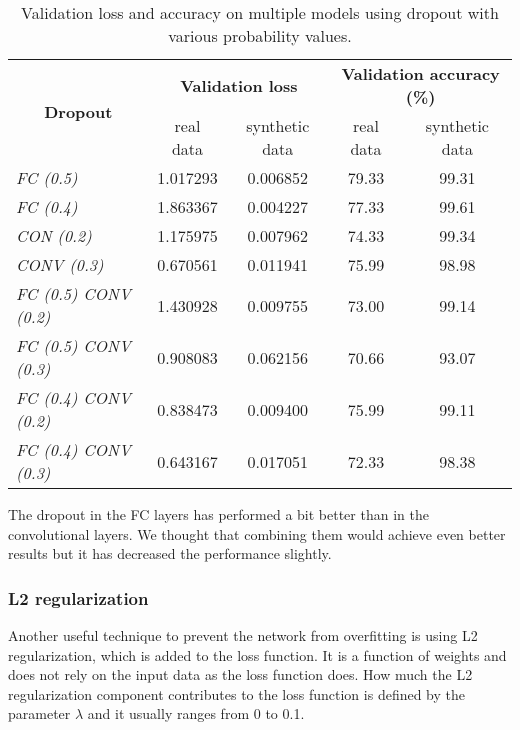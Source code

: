 {\renewcommand{\arraystretch}{1.4}
\begin{table}[h]
\centering
\begin{tabular}{|l|cc|cc|}
\hline
\multicolumn{1}{|c|}{\multirow{2}{*}{\textbf{Dropout}}} & \multicolumn{2}{c|}{\textbf{Validation loss}} & \multicolumn{2}{c|}{\textbf{Validation accuracy (\%)}} \\ \cline{2-5} 
\multicolumn{1}{|c|}{} & \multicolumn{1}{c|}{real data} & synthetic data & \multicolumn{1}{c|}{real data} & synthetic data \\ \hline
\textit{FC (0.5)} & \multicolumn{1}{c|}{1.017293} & 0.006852 & \multicolumn{1}{c|}{79.33} & 99.31 \\ \hline
\textit{FC (0.4)} & \multicolumn{1}{c|}{1.863367} & 0.004227 & \multicolumn{1}{c|}{77.33} & 99.61 \\ \hline
\textit{CON (0.2)} & \multicolumn{1}{c|}{1.175975} & 0.007962 & \multicolumn{1}{c|}{74.33} & 99.34 \\ \hline
\textit{CONV (0.3)} & \multicolumn{1}{c|}{0.670561} & 0.011941 & \multicolumn{1}{c|}{75.99} & 98.98 \\ \hline
\textit{FC (0.5) CONV (0.2)} & \multicolumn{1}{c|}{1.430928} & 0.009755 & \multicolumn{1}{c|}{73.00} & 99.14 \\ \hline
\textit{FC (0.5) CONV (0.3)} & \multicolumn{1}{c|}{0.908083} & 0.062156 & \multicolumn{1}{c|}{70.66} & 93.07 \\ \hline
\textit{FC (0.4) CONV (0.2)} & \multicolumn{1}{c|}{0.838473} & 0.009400 & \multicolumn{1}{c|}{75.99} & 99.11 \\ \hline
\textit{FC (0.4) CONV (0.3)} & \multicolumn{1}{c|}{0.643167} & 0.017051 & \multicolumn{1}{c|}{72.33} & 98.38 \\ \hline
\end{tabular}
\caption{Validation loss and accuracy on multiple models using dropout with various probability values.}
\label{tab:dropouts}
\end{table}
}

The dropout in the FC layers has performed a bit better than in the convolutional layers. We thought that combining them would achieve even better results but it has decreased the performance slightly. 


\subsubsection{L2 regularization}

Another useful technique to prevent the network from overfitting is using L2 regularization, which is added to the loss function. It is a function of weights and does not rely on the input data as the loss function does. How much the L2 regularization component contributes to the loss function is defined by the parameter $\lambda$ and it usually ranges from 0 to 0.1. 

